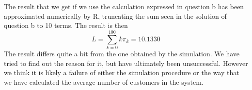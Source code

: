 \documentclass[11pt, a4paper]{article}
\begin{document}
The result that we get if we use the calculation expressed in question b has been approximated numerically by R, truncating the sum seen in the solution of question b to 10 terms. The result is then
\[
	L = \sum_{k = 0}^{100} k \pi_k = 10.1330
\]
The result differs quite a bit from the one obtained by the simulation. We have tried to find out the reason for it, but have ultimately been unsuccessful. 
However we think it is likely a failure of either the simulation procedure or the way that we have calculated the average number of customers in the system. 

\printbibliography
\end{document}
